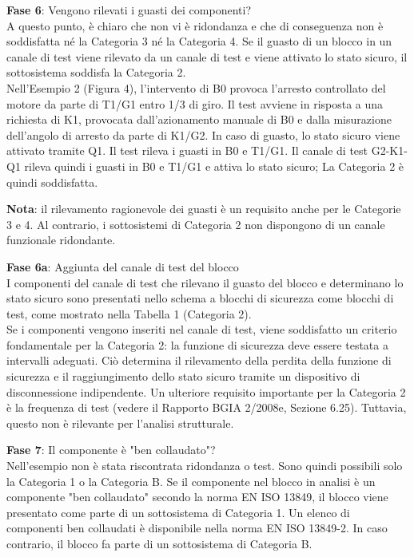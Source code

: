 \documentclass[a4paper,11pt]{article}
\begin{document}
    \par\medskip\noindent \textbf{Fase 6}: Vengono rilevati i guasti dei componenti?\\
    A questo punto, è chiaro che non vi è ridondanza e che di conseguenza non è soddisfatta né la Categoria 3 né la Categoria 4. Se il guasto di un blocco in un canale di test viene rilevato da un canale di test e viene attivato lo stato sicuro, il sottosistema soddisfa la Categoria 2.\\
    Nell'Esempio 2 (Figura 4), l'intervento di B0 provoca l'arresto controllato del motore da parte di T1/G1 entro 1/3 di giro. Il test avviene in risposta a una richiesta di K1, provocata dall'azionamento manuale di B0 e dalla misurazione dell'angolo di arresto da parte di K1/G2. In caso di guasto, lo stato sicuro viene attivato tramite Q1. Il test rileva i guasti in B0 e T1/G1. Il canale di test G2-K1-Q1 rileva quindi i guasti in B0 e T1/G1 e attiva lo stato sicuro; La Categoria 2 è quindi soddisfatta.
     
    \par\medskip\noindent \textbf{Nota}: il rilevamento ragionevole dei guasti è un requisito anche per le Categorie 3 e 4. Al contrario, i sottosistemi di Categoria 2 non dispongono di un canale funzionale ridondante.

    \par\medskip\noindent \textbf{Fase 6a}: Aggiunta del canale di test del blocco\\
    I componenti del canale di test che rilevano il guasto del blocco e determinano lo stato sicuro sono presentati nello schema a blocchi di sicurezza come blocchi di test, come mostrato nella Tabella 1 (Categoria 2).\\
    Se i componenti vengono inseriti nel canale di test, viene soddisfatto un criterio fondamentale per la Categoria 2: la funzione di sicurezza deve essere testata a intervalli adeguati. Ciò determina il rilevamento della perdita della funzione di sicurezza e il raggiungimento dello stato sicuro tramite un dispositivo di disconnessione indipendente. Un ulteriore requisito importante per la Categoria 2 è la frequenza di test (vedere il Rapporto BGIA 2/2008e, Sezione 6.25). Tuttavia, questo non è rilevante per l'analisi strutturale.
    
    \par\medskip\noindent \textbf{Fase 7}: Il componente è "ben collaudato"?\\
    Nell'esempio non è stata riscontrata ridondanza o test. Sono quindi possibili solo la Categoria 1 o la Categoria B. Se il componente nel blocco in analisi è un componente "ben collaudato" secondo la norma EN ISO 13849, il blocco viene presentato come parte di un sottosistema di Categoria 1. Un elenco di componenti ben collaudati è disponibile nella norma EN ISO 13849-2. In caso contrario, il blocco fa parte di un sottosistema di Categoria B.
    
\end{document}
